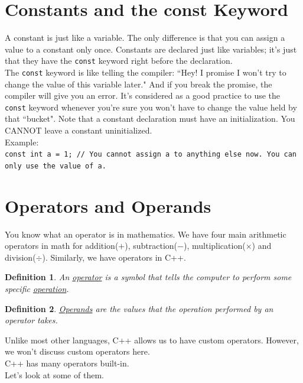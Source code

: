 \documentclass[letterpaper, 12pt]{book}
\newtheorem{definition}{Definition}
\begin{document}
\section{Constants and the const Keyword}
A constant is just like a variable. The only difference is that you can assign a value to a constant only once. Constants are declared just like variables; it's just that they have the \lstinline{const} keyword right before the declaration.\\
The \lstinline{const} keyword is like telling the compiler: ``Hey! I promise I won't try to change the value of this variable later." And if you break the promise, the compiler will give you an error. It's considered as a good practice to use the \lstinline{const} keyword whenever you're sure you won't have to change the value held by that ``bucket". Note that a constant declaration must have an initialization. You CANNOT leave a constant uninitialized.\\
Example:\\
\lstinline{const int a = 1; // You cannot assign a to anything else now. You can only use the value of a.}
\section{Operators and Operands}
You know what an operator is in mathematics. We have four main arithmetic operators in math for addition($+$), subtraction($-$), multiplication($\times$) and division($\div$). Similarly, we have operators in C++.
\begin{definition}
	An \underline{operator} is a symbol that tells the computer to perform some specific \underline{operation}. 
\end{definition}
\begin{definition}
	\underline{Operands} are the values that the operation performed by an operator takes.
\end{definition}
Unlike most other languages, C++ allows us to have custom operators. However, we won't discuss custom operators here.\\
C++ has many operators built-in.\\
Let's look at some of them.
\end{document}
